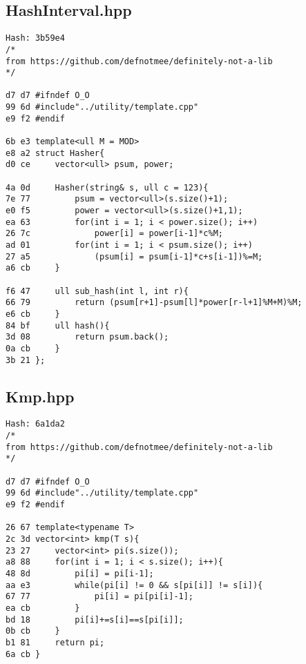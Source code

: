 \documentclass[11pt, a4paper, twoside]{article}
\begin{document}
\subsection{HashInterval.hpp}
\begin{lstlisting}
Hash: 3b59e4
/*
from https://github.com/defnotmee/definitely-not-a-lib
*/

d7 d7 #ifndef O_O
99 6d #include"../utility/template.cpp"
e9 f2 #endif

6b e3 template<ull M = MOD>
e8 a2 struct Hasher{
d0 ce     vector<ull> psum, power;
      
4a 0d     Hasher(string& s, ull c = 123){
7e 77         psum = vector<ull>(s.size()+1);
e0 f5         power = vector<ull>(s.size()+1,1);
ea 63         for(int i = 1; i < power.size(); i++)
26 7c             power[i] = power[i-1]*c%M;
ad 01         for(int i = 1; i < psum.size(); i++)
27 a5             (psum[i] = psum[i-1]*c+s[i-1])%=M;
a6 cb     }
      
f6 47     ull sub_hash(int l, int r){
66 79         return (psum[r+1]-psum[l]*power[r-l+1]%M+M)%M;
e6 cb     }
84 bf     ull hash(){
3d 08         return psum.back();
0a cb     }
3b 21 };
\end{lstlisting}

\subsection{Kmp.hpp}
\begin{lstlisting}
Hash: 6a1da2
/*
from https://github.com/defnotmee/definitely-not-a-lib
*/

d7 d7 #ifndef O_O
99 6d #include"../utility/template.cpp"
e9 f2 #endif

26 67 template<typename T>
2c 3d vector<int> kmp(T s){
23 27     vector<int> pi(s.size());
a8 88     for(int i = 1; i < s.size(); i++){
48 8d         pi[i] = pi[i-1];
aa e3         while(pi[i] != 0 && s[pi[i]] != s[i]){
67 77             pi[i] = pi[pi[i]-1];
ea cb         }
bd 18         pi[i]+=s[i]==s[pi[i]];
0b cb     }
b1 81     return pi;
6a cb }
\end{lstlisting}
\end{document}
